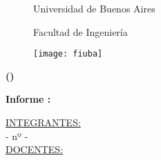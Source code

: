 \newcommand{\imgdir}{img}
\graphicspath{{\imgdir/}}


\begin{titlepage}
\centering
\begin{figure}[t]
	\centering
	{\huge  Universidad de Buenos Aires \par}
	{\huge Facultad de Ingeniería \par}
	\vspace{0.5cm}
	\texttt{[image: fiuba]}
    \vspace{1cm}
\end{figure}
	\vspace{1cm}
	{\huge \bfseries \nombreMateria \LARGE (\codigoMateria) \par}
	\vspace{1cm}
    {\textbf{\LARGE Informe \numeroInforme: \nombreInforme}\par}
    \vspace{2cm}
    {\underline{\Large INTEGRANTES:}\\}
    \vspace{0.5cm}
	{\nombreDos - nº \padronDos- \emph{\mailDos}\\ }
    \vspace{1cm}
    {\underline{\Large  DOCENTES:}\\}
    \vspace{0.5cm}
	{\Large\itshape  \docentes \par}
    \vspace{1cm}
    {\large \fecha \par}
	\vfill
\end{titlepage}

\pagestyle{fancy}
\fancyhead[C]{\rule{.5\textwidth}{4\baselineskip}}
\setlength{\headheight}{52pt}
\renewcommand{\sectionmark}[1]{\markboth{}{\thesection\ \ #1}}
\chead{}
\rhead{\codigoMateria - \nombreMateria}
\lfoot{}
\cfoot{\thepage}
\rfoot{}
